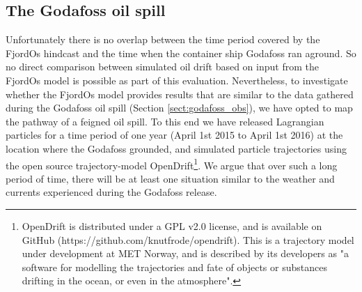 \subsection{The Godafoss oil spill}
\label{sect:godafoss_model}
Unfortunately there is no overlap between the time period covered by the FjordOs hindcast and the time when the container ship Godafoss ran aground. So no direct comparison between simulated oil drift based on input from the FjordOs model is possible as part of this evaluation. Nevertheless, to investigate whether the FjordOs model provides results that are similar to the data gathered during the Godafoss oil spill (Section \ref{sect:godafoss_obs}), we have opted to map the pathway of a feigned oil spill. To this end we have released Lagrangian particles for a time period of one year (April 1st 2015 to April 1st 2016) at the location where the Godafoss grounded, and simulated particle trajectories using the open source trajectory-model OpenDrift\footnote{OpenDrift is distributed under a GPL v2.0 license, and is available on GitHub (https://github.com/knutfrode/opendrift). This is a trajectory model under development at MET Norway, and is described by its developers as "a software for modelling the trajectories and fate of objects or substances drifting in the ocean, or even in the atmosphere".}. We argue that over such a long period of time, there will be at least one situation similar to the weather and currents experienced during the Godafoss release.

